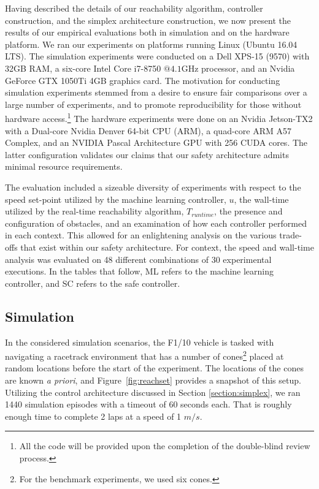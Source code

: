 \documentclass[manuscript,screen,review]{acmart}
\begin{document}
Having described the details of our reachability algorithm, controller construction, and the simplex architecture construction, we now present the results of our empirical evaluations both in simulation and on the hardware platform. We ran our experiments on platforms running Linux (Ubuntu 16.04 LTS). The simulation experiments were conducted on a Dell XPS-15 (9570) with 32GB RAM, a six-core Intel Core i7-8750 $@ 4.1\textrm{GHz}$ processor, and an Nvidia GeForce GTX 1050Ti 4GB graphics card. The motivation for conducting simulation experiments stemmed from a desire to ensure fair comparisons over a large number of experiments, and to promote reproducibility for those without hardware access.\footnote{All the code will be provided upon the completion of the double-blind review process.} The hardware experiments were done on an Nvidia Jetson-TX2 with a Dual-core Nvidia Denver 64-bit CPU (ARM), a quad-core ARM A57 Complex, and an NVIDIA Pascal Architecture GPU with 256 CUDA cores. The latter configuration validates our claims that our safety architecture admits minimal resource requirements. 


The evaluation included a sizeable diversity of experiments with respect to the speed set-point utilized by the machine learning controller, $u$, the wall-time utilized by the real-time reachability algorithm, $T_{runtime}$, the presence and configuration of obstacles, and an examination of how each controller performed in each context. This allowed for an enlightening analysis on the various trade-offs that exist within our safety architecture. For context, the speed and wall-time analysis was evaluated on 48 different combinations of 30 experimental executions. %
In the tables that follow, ML refers to the machine learning controller, and SC refers to the safe controller. %

\subsection{Simulation}
In the considered simulation scenarios, the F1/10 vehicle is tasked with navigating a racetrack environment that has a number of cones\footnote{For the benchmark experiments, we used six cones.} placed at random locations before the start of the experiment. The locations of the cones are known \emph{a priori}, and Figure~\ref{fig:reachset} provides a snapshot of this setup. Utilizing the control architecture discussed in Section \ref{section:simplex}, we ran 1440 simulation episodes with a timeout of 60 seconds each. That is roughly enough time to complete 2 laps at a speed of 1 $m/s$. %
\end{document}
